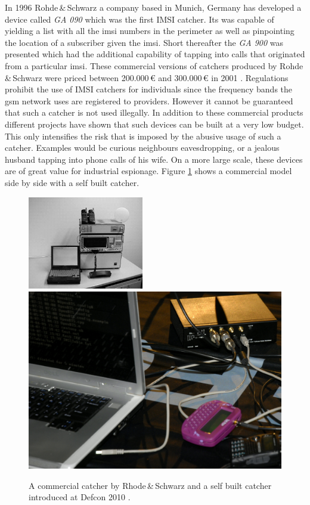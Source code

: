 In 1996 Rohde\,\&\,Schwarz a company based in Munich, Germany has developed a device called \emph{GA 090} which was the first IMSI catcher.
Its was capable of yielding a list with all the \gls{imsi} numbers in the perimeter as well as pinpointing the location of a subscriber given the \gls{imsi}.
Short thereafter the \emph{GA 900} was presented which had the additional capability of tapping into calls that originated from a particular \gls{imsi}.
These commercial versions of catchers produced by Rohde\,\&\,Schwarz were priced between 200.000\,\euro{} and 300.000\,\euro{} in 2001 \cite{fox}.
Regulations prohibit the use of IMSI catchers for individuals since the frequency bands the \gls{gsm} network uses are registered to providers.
However it cannot be guaranteed that such a catcher is not used illegally.
In addition to these commercial products different projects \cite{dennis, def_catcher} have shown that such devices can be built at a very low budget.
This only intensifies the risk that is imposed by the abusive usage of such a catcher.
Examples would be curious neighbours eavesdropping, or a jealous husband tapping into phone calls of his wife.
On a more large scale, these devices are of great value for industrial espionage.
Figure \ref{fig:catchers} shows a commercial model side by side with a self built catcher.
\begin{figure}
\centering
\includegraphics[width=0.45\textwidth]{../Images/imsi_catcher}\hspace{1cm}\includegraphics[width=.45\textwidth]{../Images/usrp}
\caption{A commercial catcher by Rhode\,\&\,Schwarz \cite{fox} and a self built catcher introduced at Defcon 2010 \cite{def_catcher}.}
\label{fig:catchers}
\end{figure}

